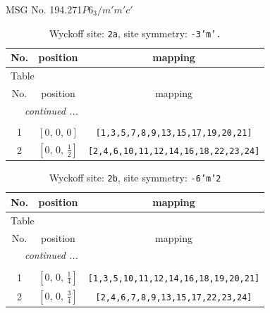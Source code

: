 \documentclass[fleqn,8pt]{jsarticle}
\begin{document}
\setcounter{MaxMatrixCols}{32}

\renewcommand{\tablename}{Table~}
\renewcommand{\figurename}{Figure~}
\begin{center}
\LARGE
MSG No. 194.271\quad$P6_{3}/m'm'c'$
\end{center}
\renewcommand{\arraystretch}{1.2}
\begin{longtable}{ccc}
\caption{Wyckoff site: {\tt 2a}, site symmetry: {\tt -3'm'.}}
 \\
 \hline \hline
No. & position & mapping \\ \hline \endfirsthead

\multicolumn{2}{l}{\tablename\ \thetable{}} \\
 \hline \hline
No. & position & mapping \\ \hline \endhead

 \hline \hline
\multicolumn{2}{r}{\footnotesize\it continued ...} \\ \endfoot

 \hline \hline
\multicolumn{2}{r}{} \\ \endlastfoot

1 & $\left[ 0,\, 0,\, 0 \right]$ & {\tt [1,3,5,7,8,9,13,15,17,19,20,21]} \\ \hline
2 & $\left[ 0,\, 0,\, \frac{1}{2} \right]$ & {\tt [2,4,6,10,11,12,14,16,18,22,23,24]} \\
\end{longtable}
\renewcommand{\arraystretch}{1.2}
\begin{longtable}{ccc}
\caption{Wyckoff site: {\tt 2b}, site symmetry: {\tt -6'm'2}}
 \\
 \hline \hline
No. & position & mapping \\ \hline \endfirsthead

\multicolumn{2}{l}{\tablename\ \thetable{}} \\
 \hline \hline
No. & position & mapping \\ \hline \endhead

 \hline \hline
\multicolumn{2}{r}{\footnotesize\it continued ...} \\ \endfoot

 \hline \hline
\multicolumn{2}{r}{} \\ \endlastfoot

1 & $\left[ 0,\, 0,\, \frac{1}{4} \right]$ & {\tt [1,3,5,10,11,12,14,16,18,19,20,21]} \\ \hline
2 & $\left[ 0,\, 0,\, \frac{3}{4} \right]$ & {\tt [2,4,6,7,8,9,13,15,17,22,23,24]} \\
\end{longtable}
\end{document}

